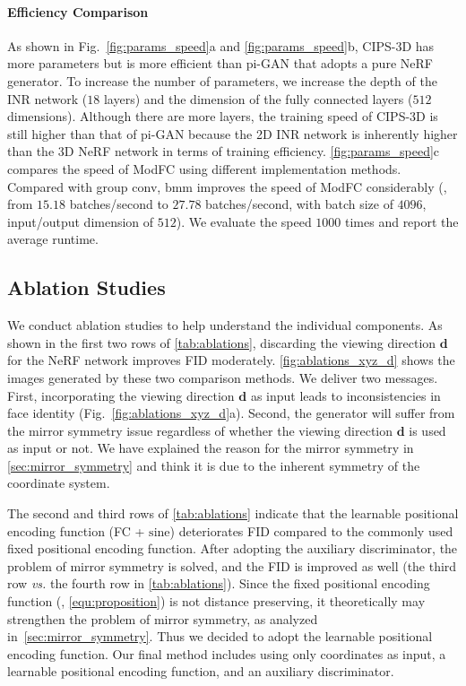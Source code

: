 \documentclass[10pt,twocolumn,letterpaper]{article}
\def\vd{{\bm{d}}}
\begin{document}
\paragraph{Efficiency Comparison}
As shown in Fig.~\ref{fig:params_speed}a and \ref{fig:params_speed}b, CIPS-3D has more parameters but is more efficient than pi-GAN that adopts a pure NeRF generator. To increase the number of parameters, we increase the depth of the INR network ($18$ layers) and the dimension of the fully connected layers ($512$ dimensions). Although there are more layers, the training speed of CIPS-3D is still higher than that of pi-GAN because the 2D INR network is inherently higher than the 3D NeRF network in terms of training efficiency. \cref{fig:params_speed}c compares the speed of ModFC using different implementation methods. Compared with group conv, $\mathrm{bmm}$ improves the speed of ModFC considerably (\ie, from $15.18$ batches/second to $27.78$ batches/second, with batch size of $4096$, input/output dimension of $512$). We evaluate the speed $1000$ times and report the average runtime.














\subsection{Ablation Studies}
\label{sec:exp:ablation}

We conduct ablation studies to help understand the individual components. As shown in the first two rows of \cref{tab:ablations}, discarding the viewing direction $\vd$ for the NeRF network improves FID moderately. \cref{fig:ablations_xyz_d} shows the images generated by these two comparison methods. We deliver two messages. First, incorporating the viewing direction $\vd$ as input leads to inconsistencies in face identity (Fig.~\ref{fig:ablations_xyz_d}a). Second, the generator will suffer from the mirror symmetry issue regardless of whether the viewing direction $\vd$ is used as input or not. We have explained the reason for the mirror symmetry in \cref{sec:mirror_symmetry} and think it is due to the inherent symmetry of the coordinate system.

The second and third rows of \cref{tab:ablations} indicate that the learnable positional encoding function (FC + $\mathrm{sine}$) deteriorates FID compared to the commonly used fixed positional encoding function. After adopting the auxiliary discriminator, the problem of mirror symmetry is solved, and the FID is improved as well (the third row \textit{vs.} the fourth row in \cref{tab:ablations}). Since the fixed positional encoding function (\ie, \cref{equ:proposition}) is not distance preserving, it theoretically may strengthen the problem of mirror symmetry, as analyzed in~\cref{sec:mirror_symmetry}. Thus we decided to adopt the learnable positional encoding function. Our final method includes using only coordinates as input, a learnable positional encoding function, and an auxiliary discriminator.
\end{document}
